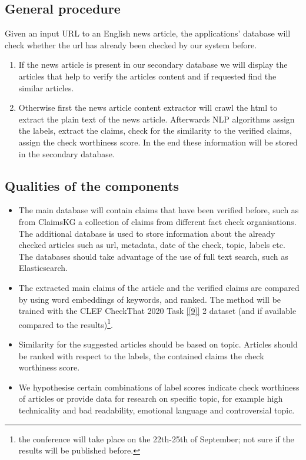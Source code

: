 \documentclass[10pt]{article}
\begin{document}
\subsection{General procedure}
Given an input URL to an English news article, the applications' database will check whether the url has already been checked by our system before.
\begin{enumerate}
\item If the news article is present in our secondary database we will display the articles that help to verify the articles content and if requested find the similar articles.
\item Otherwise first the news article content extractor will crawl the html to extract the plain text of the news article.
Afterwards NLP algorithms assign the labels, extract the claims, check for the similarity to the verified claims, assign the check worthiness score.
In the end these information will be stored in the secondary database.
\end{enumerate}

\subsection{Qualities of the components}
\begin{itemize}
\item The main database will contain claims that have been verified before, such as from ClaimsKG a collection of claims from different fact check organisations.
The additional database is used to store information about the already checked articles such as url, metadata, date of the check, topic, labels etc.
The databases should take advantage of the use of full text search, such as Elasticsearch.
\item The extracted main claims of the article and the verified claims are compared by using word embeddings of keywords, and ranked.
The method will be trained with the CLEF CheckThat 2020 Task \ref{[9]} 2 dataset (and if available compared to the results)\footnote{the conference will take place on the 22th-25th of September; not sure if the results will be published before.}.
\item Similarity for the suggested articles should be based on topic. Articles should be ranked with respect to the labels, the contained claims the check worthiness score. 
\item We hypothesise certain combinations of label scores indicate check worthiness of articles or provide data for research on specific topic, for example high technicality and bad readability, emotional language and controversial topic.
\end{itemize}
\end{document}
